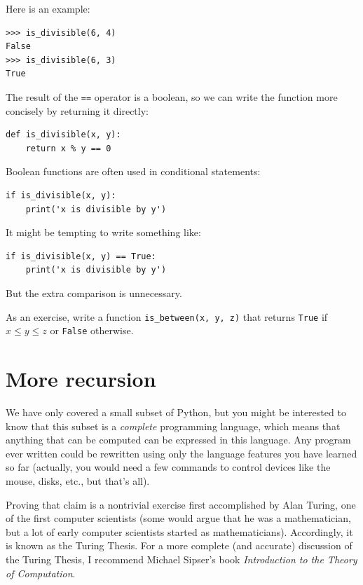 \documentclass[10pt]{book}
\begin{document}
Here is an example:

\begin{verbatim}
>>> is_divisible(6, 4)
False
>>> is_divisible(6, 3)
True
\end{verbatim}
%
The result of the {\tt ==} operator is a boolean, so we can write the
function more concisely by returning it directly:

\begin{verbatim}
def is_divisible(x, y):
    return x % y == 0
\end{verbatim}
%
Boolean functions are often used in conditional statements:

\begin{verbatim}
if is_divisible(x, y):
    print('x is divisible by y')
\end{verbatim}
%
It might be tempting to write something like:

\begin{verbatim}
if is_divisible(x, y) == True:
    print('x is divisible by y')
\end{verbatim}
%
But the extra comparison is unnecessary.

As an exercise, write a function \verb"is_between(x, y, z)" that
returns {\tt True} if $x \le y \le z$ or {\tt False} otherwise.


\section{More recursion}
\label{more.recursion}

We have only covered a small subset of Python, but you might
be interested to know that this subset is a {\em complete}
programming language, which means that anything that can be
computed can be expressed in this language.  Any program ever written
could be rewritten using only the language features you have learned
so far (actually, you would need a few commands to control devices
like the mouse, disks, etc., but that's all).

Proving that claim is a nontrivial exercise first accomplished by Alan
Turing, one of the first computer scientists (some would argue that he
was a mathematician, but a lot of early computer scientists started as
mathematicians).  Accordingly, it is known as the Turing Thesis.
For a more complete (and accurate) discussion of the Turing Thesis,
I recommend Michael Sipser's book {\em Introduction to the
Theory of Computation}.
\end{document}
